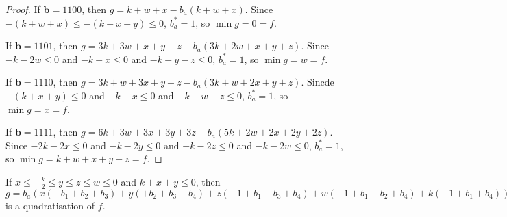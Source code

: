 \documentclass[11pt]{scrartcl}
\newcommand{\vc}[1]{\boldsymbol{#1}}
\begin{document}
\begin{proof}
If $\vc b = 1100$, then $g = k + w + x - b_a(k + w + x)$.
Since $-(k+w+x) \le -(k+x+y) \le 0$, $b_a^* = 1$, so $\min g = 0 = f$.

If $\vc b = 1101$, then $g = 3k + 3w + x + y + z - b_a(3k + 2w + x + y + z)$.
Since $-k -2w \le 0$ and $-k - x \le 0$ and $-k -y - z \le 0$, $b_a^* = 1$, so $\min g = w = f$.

If $\vc b = 1110$, then $g = 3k + w + 3x + y + z - b_a(3k + w + 2x + y + z)$.
Sincde $-(k+x+y) \le 0$ and $-k - x \le 0$ and $-k - w - z \le 0$, $b_a^* = 1$, so $\min g = x = f$.

If $\vc b = 1111$, then $g = 6k + 3w + 3x + 3y + 3z - b_a(5k + 2w + 2x + 2y + 2z)$.
Since $-2k - 2x \le 0$ and $-k - 2y \le 0$ and $-k -2z \le 0$ and $-k -2w \le 0$, $b_a^* = 1$, so $\min g = k + w + x + y + z = f$.

\end{proof}

\begin{lemma}
	\label{case2}
 If $x \le -\frac{k}{2} \le y \le z \le w \le 0$ and $k+x+y \le 0$, then $g = b_a(x(-b_1+b_2+b_3)+y(+b_2+b_3-b_4)+z(-1+b_1-b_3+b_4)+w(-1+b_1-b_2+b_4)+k(-1+b_1+b_4))+x(-b_2-b_3+b_1b_2+b_1b_3)+y(-b_2-b_3+b_2b_4+b_3b_4)+z(+1 -b_1+b_3-b_4+b_1b_4)+w(+1 -b_1+b_2-b_4+b_1b_4)+k(+1 -b_1-b_4+b_1b_4)$ is a quadratisation of $f$.
 \end{lemma}
\end{document}
